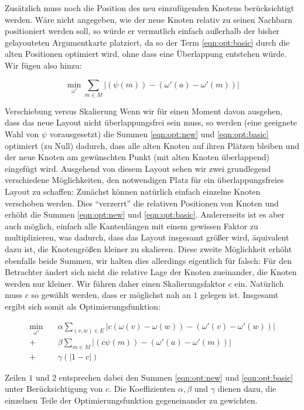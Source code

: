 Zusätzlich muss noch die Position des neu einzufügenden Knotens berücksichtigt werden. Wäre nicht angegeben, wie der neue Knoten relativ zu seinen Nachbarn positioniert werden soll, so würde er vermutlich einfach außerhalb der bisher gelayouteten Argumentkarte platziert, da so der Term \ref{eqn:opt:basic} durch die alten Positionen optimiert wird, ohne dass eine Überlappung entstehen würde. Wir fügen also hinzu:

\begin{equation}
  \label{eqn:opt:new}
  \min_{\omega'} \sum \limits_{m \in M} {|(\psi(m)) - (\omega'(a) - \omega'(m))|}
\end{equation}

\begin{paragraph}{Verschiebung versus Skalierung}
  Wenn wir für einen Moment davon ausgehen, dass das neue Layout nicht überlappungsfrei sein muss, so werden (eine geeignete Wahl von $\psi$ vorausgesetzt) die Summen \ref{eqn:opt:new} und \ref{eqn:opt:basic} optimiert (zu Null) dadurch, dass alle alten Knoten auf ihren Plätzen bleiben und der neue Knoten am gewünschten Punkt (mit alten Knoten überlappend) eingefügt wird. Ausgehend von diesem Layout sehen wir zwei grundlegend verschiedene Möglichkeiten, den notwendigen Platz für ein überlappungsfreies Layout zu schaffen: Zunächst können natürlich einfach einzelne Knoten verschoben werden. Dies "`verzerrt"' die relativen Positionen von Knoten und erhöht die Summen \ref{eqn:opt:new} und \ref{eqn:opt:basic}. Andererseits ist es aber auch möglich, einfach alle Kantenlängen mit einem gewissen Faktor zu multiplizieren, was dadurch, dass das Layout insgesamt größer wird, äquivalent dazu ist, die Knotengrößen kleiner zu skalieren. Diese zweite Möglichkeit erhöht ebenfalls beide Summen, wir halten dies allerdings eigentlich für falsch: Für den Betrachter ändert sich nicht die relative Lage der Knoten zueinander, die Knoten werden nur kleiner. Wir führen daher einen Skalierungsfaktor $c$ ein. Natürlich muss $c$ so gewählt werden, dass er möglichst nah an $1$ gelegen ist. Insgesamt ergibt sich somit als Optimierungsfunktion:
\end{paragraph}

\begin{align}
  \label{eqn:opt:complete}
 \min_{\omega'} \quad & \alpha \sum \limits_{(v,w) \in E} {|c(\omega(v) - \omega(w)) - (\omega'(v) - \omega'(w))|} \nonumber \\
  + & \beta \sum \limits_{m \in M} {|(c\psi(m)) - (\omega'(a) - \omega'(m))|} \nonumber \\
  + & \gamma (|1 - c|)
\end{align}

Zeilen $1$ und $2$ entsprechen dabei den Summen \ref{eqn:opt:new} und \ref{eqn:opt:basic} unter Berücksichtigung von $c$. Die Koeffizienten $\alpha, \beta$ und $\gamma$ dienen dazu, die einzelnen Teile der Optimierungsfunktion gegeneinander zu gewichten.
